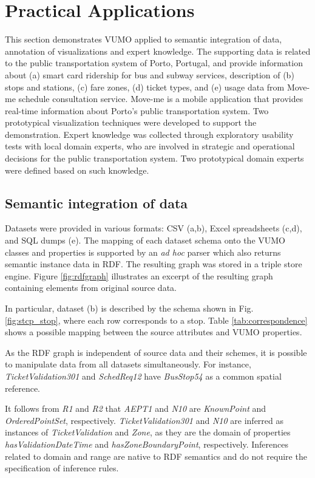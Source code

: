 \documentclass[]{interact}
\theoremstyle{plain}%
\theoremstyle{definition}
\theoremstyle{remark}
\theoremstyle{definition}
\begin{document}
\section{Practical Applications}
\label{sec:practical}

This section demonstrates VUMO applied to semantic integration of data, annotation of visualizations and expert knowledge. The supporting data is related to the public transportation system of Porto, Portugal, and provide information about (a) smart card ridership for bus and subway services, description of (b) stops and stations, (c) fare zones, (d) ticket types, and (e) usage data from Move-me schedule consultation service. Move-me is a mobile application that provides real-time information about Porto's public transportation system. Two prototypical visualization techniques were developed to support the demonstration. Expert knowledge was collected through exploratory usability tests with local domain experts, who are involved in strategic and operational decisions for the public transportation system. Two prototypical domain experts were defined based on such knowledge.

\subsection{Semantic integration of data}

Datasets were provided in various formats: CSV (a,b), Excel spreadsheets (c,d), and SQL dumps (e). The mapping of each dataset schema onto the VUMO classes and properties is supported by an \textit{ad hoc} parser which also returns semantic instance data in RDF. The resulting graph was stored in a triple store engine. Figure \ref{fig:rdfgraph} illustrates an excerpt of the resulting graph containing elements from original source data.

In particular, dataset (b) is described by the schema shown in Fig. \ref{fig:stcp_stop}, where each row corresponds to a stop. Table \ref{tab:correspondence} shows a possible mapping between the source attributes and VUMO properties.

As the RDF graph is independent of source data and their schemes, it is possible to manipulate data from all datasets simultaneously. For instance, \textit{TicketValidation301} and \textit{SchedReq12} have \textit{BusStop54} as a common spatial reference.

It follows from \textit{R1} and \textit{R2} that \textit{AEPT1} and \textit{N10} are \textit{KnownPoint} and \textit{OrderedPointSet}, respectively. \textit{TicketValidation301} and \textit{N10} are inferred as instances of \textit{TicketValidation} and \textit{Zone}, as they are the domain of properties \textit{hasValidationDateTime} and \textit{hasZoneBoundaryPoint}, respectively. Inferences related to domain and range are native to RDF semantics and do not require the specification of inference rules.
\end{document}
